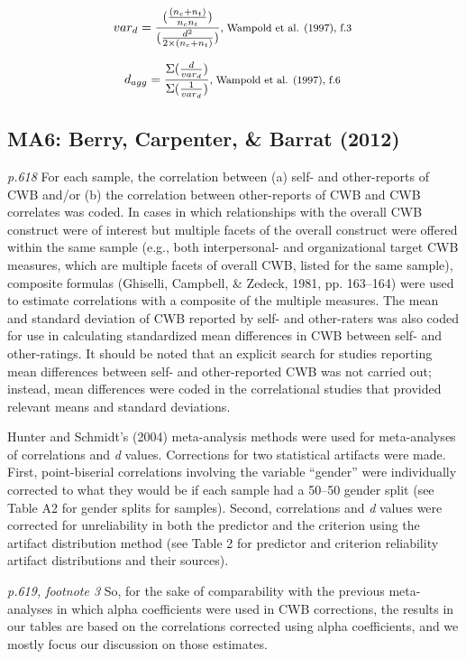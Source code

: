 \documentclass{article}
\begin{document}
\begin{equation*}
var_{d}=\frac{(\frac {(n_{c}+n_{t})}{n_{c}n_{t}})}{(\frac{d^{2}}{2 \times (n_{c} + n_{t})})} \mbox{\footnotesize, Wampold et al. (1997), f.3 }
\end{equation*}

\begin{equation*}
d_{agg}=\frac{\Sigma(\frac{d}{var_{d}})}{\Sigma(\frac{1}{var_{d}})} \mbox{\footnotesize, Wampold et al. (1997), f.6 }
\end{equation*}

\subsection*{MA6: Berry, Carpenter, \& Barrat (2012)}

\textit{p.618} For each sample, the correlation between (a) self- and other-reports of CWB and/or (b) the correlation between other-reports of CWB and CWB correlates was coded. In cases in which relationships with the overall CWB construct were of interest but multiple facets of the overall construct were offered within the same sample (e.g., both interpersonal- and organizational target CWB measures, which are multiple facets of overall CWB, listed for the same sample), composite formulas (Ghiselli, Campbell, \& Zedeck, 1981, pp. 163–164) were used to estimate correlations with a composite of the multiple measures. The mean and standard deviation of CWB reported by self- and other-raters was also coded for use in calculating standardized mean differences in CWB between self- and other-ratings. It should be noted that an explicit search for studies reporting mean differences between self- and other-reported CWB was not carried out; instead, mean differences were coded in the correlational studies that provided relevant means and standard deviations. 

Hunter and Schmidt’s (2004) meta-analysis methods were used for meta-analyses of correlations and \textit{d} values. Corrections for two statistical artifacts were made. First, point-biserial correlations involving the variable “gender” were individually corrected to what they would be if each sample had a 50–50 gender split (see Table A2 for gender splits for samples). Second, correlations and \textit{d} values were corrected for unreliability in both the predictor and the criterion using the artifact distribution method (see Table 2 for predictor and criterion reliability artifact distributions and their sources).

\textit{p.619, footnote 3} So, for the sake of comparability with the previous meta-analyses in which alpha coefficients were used in CWB corrections, the results in our tables are based on the correlations corrected using alpha coefficients, and we mostly focus our discussion on those estimates.
\end{document}
